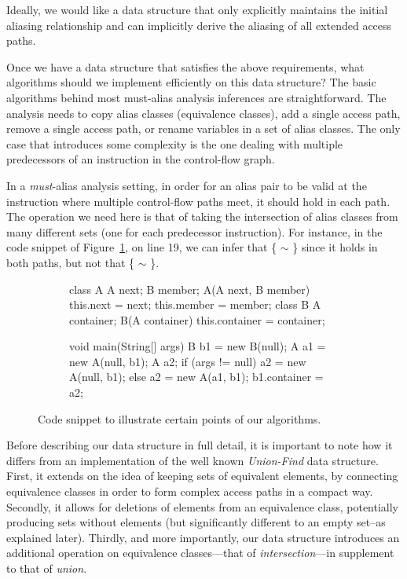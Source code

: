Ideally, we would like a data structure that only explicitly maintains the initial aliasing relationship and can implicitly derive the aliasing of all extended access paths.


Once we have a data structure that satisfies the above requirements, what algorithms should we implement efficiently on this data structure? The basic algorithms behind most must-alias analysis inferences are straightforward. The analysis needs to copy alias classes (equivalence classes), add a single access path, remove a single access path, or rename variables in a set of alias classes. The only case that introduces some complexity is the one dealing with multiple predecessors of an instruction in the control-flow graph.

In a \emph{must}-alias analysis setting, in order for an alias pair to be valid at the instruction where multiple control-flow paths meet, it should hold in each path. The operation we need here is that of taking the intersection of alias classes from many different sets (one for each predecessor instruction). For instance, in the code snippet of Figure~\ref{fig:must-data:snippet}, on line 19, we can infer that \{ $\sim$ \} since it holds in both paths, but not that \{ $\sim$ \}.

\begin{figure}[htb!p]
\begin{subfigure}{.45\textwidth}
\begin{javacode}
class A { 
    A next;
    B member;
    A(A next, B member) {
        this.next = next;
        this.member = member; } }
class B {
    A container;
    B(A container) {
        this.container = container; } }
\end{javacode}
\end{subfigure}%
\hfill
\begin{subfigure}{.45\textwidth}
\begin{javacode2}
void main(String[] args) {
    B b1 = new B(null);
    A a1 = new A(null, b1);
    A a2;
    if (args != null) 
        a2 = new A(null, b1);
    else
        a2 = new A(a1, b1);
    b1.container = a2;
}
\end{javacode2}
\end{subfigure}
\caption{Code snippet to illustrate certain points of our algorithms.}
\label{fig:must-data:snippet}
\end{figure}


Before describing our data structure in full detail, it is important to note how it differs from an implementation of the well known \emph{Union-Find} data structure. First, it extends on the idea of keeping sets of equivalent elements, by connecting equivalence classes in order to form complex access paths in a compact way. Secondly, it allows for deletions of elements from an equivalence class, potentially producing sets without elements (but significantly different to an empty set--as explained later). Thirdly, and more importantly, our data structure introduces an additional operation on equivalence classes---that of \emph{intersection}---in supplement to that of \emph{union}.

